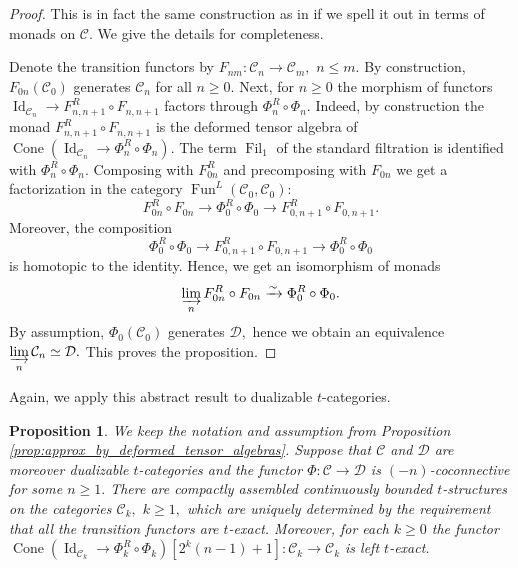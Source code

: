 \documentclass[11pt,leqno]{amsart}
\newtheorem{prop}[theo]{Proposition}
\numberwithin{equation}{section}
\newcommand{\indlim}[1][]{\mathop{\varinjlim}\limits_{#1}}
\newcommand{\xto}{\xrightarrow}
\newcommand{\Cone}{\operatorname{Cone}}
\newcommand{\Fil}{\operatorname{Fil}}
\newcommand{\cD}{{\mathcal D}}
\newcommand{\cC}{{\mathcal C}}
\newcommand{\Fun}{\operatorname{Fun}}
\newcommand{\Id}{\operatorname{Id}}
\begin{document}
\begin{proof}
This is in fact the same construction as in \cite[Proof of Proposition 3.15]{E25c} if we spell it out in terms of monads on $\cC.$ We give the details for completeness.

Denote the transition functors by $F_{nm}:\cC_n\to\cC_m,$ $n\leq m.$ By construction, $F_{0n}(\cC_0)$ generates $\cC_n$ for all $n\geq 0.$ Next, for $n\geq 0$ the morphism of functors $\Id_{\cC_n}\to F_{n,n+1}^R\circ F_{n,n+1}$ factors through $\Phi_n^R\circ\Phi_n.$ Indeed, by construction the monad $F_{n,n+1}^R\circ F_{n,n+1}$ is the deformed tensor algebra of $\Cone(\Id_{\cC_n}\to \Phi_n^R\circ \Phi_n).$ The term $\Fil_1$ of the standard filtration is identified with $\Phi_n^R\circ \Phi_n.$ Composing with $F_{0n}^R$ and precomposing with $F_{0n}$ we get a factorization in the category $\Fun^L(\cC_0,\cC_0):$
\begin{equation*}
F_{0n}^R\circ F_{0n}\to \Phi_0^R\circ \Phi_0\to F_{0,n+1}^R\circ F_{0,n+1}.
\end{equation*}
Moreover, the composition
\begin{equation*}
\Phi_0^R\circ \Phi_0\to F_{0,n+1}^R\circ F_{0,n+1}\to \Phi_0^R\circ\Phi_0
\end{equation*}
is homotopic to the identity. Hence, we get an isomorphism of monads
\begin{equation*}
\indlim[n] F_{0n}^R\circ F_{0n}\xto{\sim} \Phi_0^R\circ \Phi_0.
\end{equation*}
By assumption, $\Phi_0(\cC_0)$ generates $\cD,$ hence we obtain an equivalence $\indlim[n]\cC_n\simeq \cD.$ This proves the proposition.
\end{proof}

Again, we apply this abstract result to dualizable $t$-categories.

\begin{prop}\label{prop:approx_by_deformed_for_t_categories} We keep the notation and assumption from Proposition \ref{prop:approx_by_deformed_tensor_algebras}. Suppose that $\cC$ and $\cD$ are moreover dualizable $t$-categories and the functor $\Phi:\cC\to\cD$ is $(-n)$-coconnective for some $n\geq 1.$ There are compactly assembled continuously bounded $t$-structures on the categories $\cC_k,$ $k\geq 1,$ which are uniquely determined by the requirement that all the transition functors are $t$-exact. Moreover, for each $k\geq 0$ the functor $\Cone(\Id_{\cC_k}\to\Phi_k^R\circ\Phi_k)[2^k(n-1)+1]:\cC_k\to\cC_k$ is left $t$-exact.
\end{prop}
\end{document}
